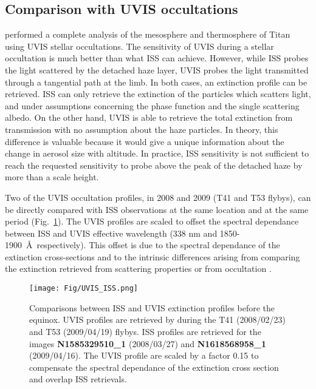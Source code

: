 \subsection{Comparison with UVIS occultations}

\cite{Koskinen2011} performed a complete analysis of the mesosphere and thermosphere of Titan using UVIS stellar
occultations. The sensitivity of UVIS during a stellar occultation is much better than what ISS can achieve. However,
while ISS probes the light scattered by the detached haze layer, UVIS probes the light transmitted through a tangential
path at the limb. In both cases, an extinction profile can be retrieved. ISS can only retrieve the extinction of the
particles which scatters light, and under assumptions concerning the phase function and the single scattering albedo.
On the other hand, UVIS is able to retrieve the total extinction from transmission with no assumption about the haze
particles. In theory, this difference is valuable because it would give a unique information about the change in aerosol
size with altitude. In practice, ISS sensitivity is not sufficient to reach the requested sensitivity to probe above
the peak of the detached haze by more than a scale height.

Two of the UVIS occultation profiles, in 2008 and 2009 (T41 and T53 flybys), can be directly compared with ISS
observations at the same location and at the same period (Fig.~\ref{fig:uvis_iss}). The UVIS profiles are scaled to
offset the spectral dependance between ISS and UVIS effective wavelength (338 nm and 1850-1900~\AA~respectively).
This offset is due to the spectral dependance of the extinction cross-sections and to the intrinsic
differences arising from comparing the extinction retrieved from scattering properties or from occultation
\citep[see.][]{Cours2011}.

\begin{figure}[!ht]
    \centering
    \texttt{[image: Fig/UVIS\_ISS.png]}
    \caption[UVIS comparison]{Comparisons between ISS and UVIS extinction profiles before the equinox.
            UVIS profiles are retrieved by \cite{Koskinen2011} during the T41 (2008/02/23) and T53 (2009/04/19) flybys.
            ISS profiles are retrieved for the images \textbf{N1585329510\_1} (2008/03/27) and
            \textbf{N1618568958\_1} (2009/04/16).
            The UVIS profile are scaled by a factor 0.15 to compensate the spectral dependance of the extinction
            cross section and overlap ISS retrievals.}
    \label{fig:uvis_iss}
\end{figure}

